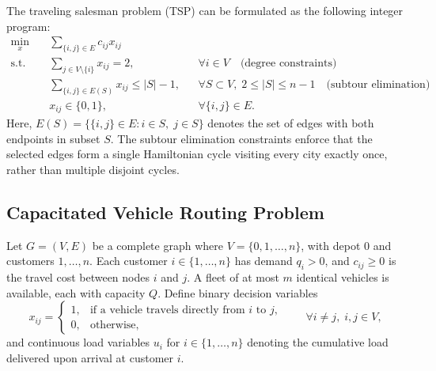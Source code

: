 The traveling salesman problem (TSP) can be formulated as the following integer program:
\[
\begin{aligned}
\min_{x}\quad & \sum_{\{i,j\}\in E} c_{ij} x_{ij} \\
\text{s.t.}\quad
& \sum_{j\in V\setminus\{i\}} x_{ij} = 2, && \forall i\in V
  \quad \text{(degree constraints)}\\
& \sum_{\{i,j\}\in E(S)} x_{ij} \le |S|-1, && \forall S\subset V,\; 2\le |S|\le n-1
  \quad \text{(subtour elimination)}\\
& x_{ij}\in\{0,1\}, && \forall \{i,j\}\in E.
\end{aligned}
\]
Here, $E(S) = \{\{i,j\}\in E : i\in S,\; j\in S\}$ denotes the set of edges with both
endpoints in subset $S$. The subtour elimination constraints enforce that the selected edges
form a single Hamiltonian cycle visiting every city exactly once, rather than multiple
disjoint cycles.

\subsection{Capacitated Vehicle Routing Problem}
\label{subsec:cvrp}

Let $G=(V,E)$ be a complete graph where $V = \{0,1,\dots,n\}$, with depot $0$ and customers
$1,\dots,n$. Each customer $i\in\{1,\dots,n\}$ has demand $q_i>0$, and $c_{ij}\ge 0$ is the
travel cost between nodes $i$ and $j$. A fleet of at most $m$ identical vehicles is available,
each with capacity $Q$. Define binary decision variables
\[
x_{ij}=
\begin{cases}
1, & \text{if a vehicle travels directly from } i \text{ to } j,\\
0, & \text{otherwise,}
\end{cases}
\qquad \forall i\ne j,\; i,j\in V,
\]
and continuous load variables $u_i$ for $i\in\{1,\dots,n\}$ denoting the cumulative load
delivered upon arrival at customer $i$.

